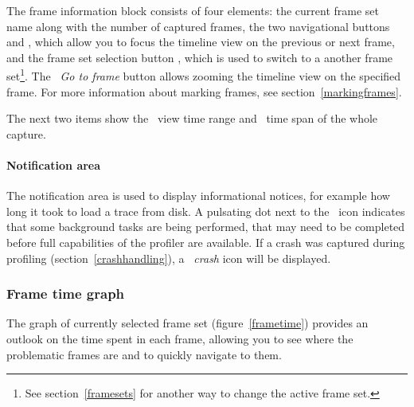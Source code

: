\documentclass[hidelinks,titlepage,a4paper]{article}
\begin{document}
The frame information block consists of four elements: the current frame set name along with the number of captured frames, the two navigational buttons \faCaretLeft{} and \faCaretRight{}, which allow you to focus the timeline view on the previous or next frame, and the frame set selection button \faCaretDown{}, which is used to switch to a another frame set\footnote{See section~\ref{framesets} for another way to change the active frame set.}. The \emph{\faCrosshairs{}~Go to frame} button allows zooming the timeline view on the specified frame. For more information about marking frames, see section~\ref{markingframes}.

The next two items show the \faEye{}~view time range and \faDatabase{}~time span of the whole capture.

\paragraph{Notification area}

The notification area is used to display informational notices, for example how long it took to load a trace from disk. A pulsating dot next to the \faTasks~icon indicates that some background tasks are being performed, that may need to be completed before full capabilities of the profiler are available. If a crash was captured during profiling (section~\ref{crashhandling}), a \emph{\faSkull{}~crash} icon will be displayed.

\subsubsection{Frame time graph}

The graph of currently selected frame set (figure~\ref{frametime}) provides an outlook on the time spent in each frame, allowing you to see where the problematic frames are and to quickly navigate to them.
\end{document}
